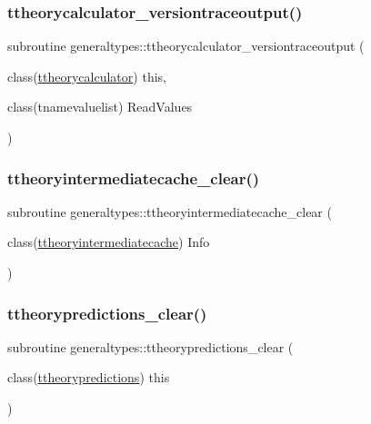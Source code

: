 \subsubsection{\texorpdfstring{ttheorycalculator\+\_\+versiontraceoutput()}{ttheorycalculator\_versiontraceoutput()}}
{\footnotesize\ttfamily subroutine generaltypes\+::ttheorycalculator\+\_\+versiontraceoutput (\begin{DoxyParamCaption}\item[{class(\mbox{\hyperlink{structgeneraltypes_1_1ttheorycalculator}{ttheorycalculator}})}]{this,  }\item[{class(tnamevaluelist)}]{Read\+Values }\end{DoxyParamCaption})\hspace{0.3cm}{\ttfamily [private]}}

\mbox{\label{namespacegeneraltypes_a890f7aa63579a54ec8ca5a3a8d19a607}} 
\subsubsection{\texorpdfstring{ttheoryintermediatecache\+\_\+clear()}{ttheoryintermediatecache\_clear()}}
{\footnotesize\ttfamily subroutine generaltypes\+::ttheoryintermediatecache\+\_\+clear (\begin{DoxyParamCaption}\item[{class(\mbox{\hyperlink{structgeneraltypes_1_1ttheoryintermediatecache}{ttheoryintermediatecache}})}]{Info }\end{DoxyParamCaption})\hspace{0.3cm}{\ttfamily [private]}}

\mbox{\label{namespacegeneraltypes_a445b06716a45b37bc3100a23b2742d2e}} 
\subsubsection{\texorpdfstring{ttheorypredictions\+\_\+clear()}{ttheorypredictions\_clear()}}
{\footnotesize\ttfamily subroutine generaltypes\+::ttheorypredictions\+\_\+clear (\begin{DoxyParamCaption}\item[{class(\mbox{\hyperlink{structgeneraltypes_1_1ttheorypredictions}{ttheorypredictions}})}]{this }\end{DoxyParamCaption})\hspace{0.3cm}{\ttfamily [private]}}

